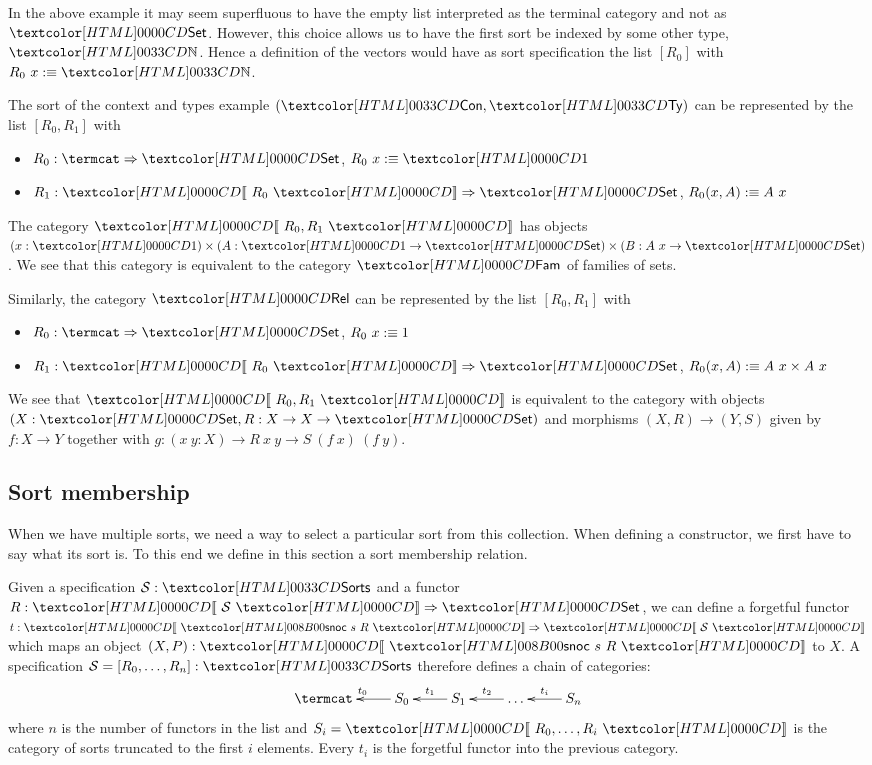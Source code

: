 In the above example it may seem superfluous to have the empty list
interpreted as the terminal category and not as $\Set$. However, this
choice allows us to have the first sort be indexed by some other type,
\eg $\natty$. Hence a definition of the vectors would have as sort
specification the list $[R_0]$ with $R_0\ x \ddefeq \natty$.

\begin{example}
  The sort of the context and types example $(\ttconty, \tttyty)$ can be
  represented by the list $[R_0, R_1]$ with
  \begin{itemize}
  \item $R_0 : \Func{\termcat}{\Set}$, $R_0\ x \ddefeq \unitty$
  \item $R_1 : \Func{\SortCat{R_0}}{\Set}$, $R_0 (x, A) :\equiv A\ x$
  \end{itemize}
  The category $\SortCat{R_0,R_1}$ has objects
  $(x : \unitty) \times (A : \unitty \to \Set) \times (B : A\ x \to
  \Set)$.
  We see that this category is equivalent to the category $\Fam$ of
  families of sets.
\end{example}

\begin{example}
  \label{rel-sorts}
  Similarly, the category $\Rel$ can be represented by the list
  $[R_0, R_1]$ with
  \begin{itemize}
  \item $R_0 : \Func{\termcat}{\Set}$, $R_0\ x :\equiv 1$
  \item $R_1 : \Func{\SortCat{R_0}}{\Set}$, $R_0 (x, A) :\equiv A\ x \times A\ x$
  \end{itemize}
  We see that $\SortCat{R_0,R_1}$ is equivalent to the category with
  objects $(X : \Set, R : X \to X \to \Set)$ and morphisms
  $(X,R) \to (Y,S)$ given by $f : X \to Y$ together with
  $g : (x\ y: X) \to R\ x\ y \to S\ (f\ x)\ (f\ y)$.
\end{example}

\subsection{Sort membership}

When we have multiple sorts, we need a way to select a particular sort
from this collection. When defining a constructor, we first have to
say what its sort is. To this end we define in this section a sort
membership relation.

Given a specification $\Ss : \sortsty$ and a functor
$R : \Func{\SortCat{\Ss}}{\Set}$, we can define a forgetful functor
$t : \Func{\SortCat{\sortssnoc\ s\ R}}{\SortCat{\Ss}}$ which maps an object
$(X , P) : \SortCat{\sortssnoc\ s\ R}$ to $X$. A specification
$\Ss = [R_0, \ldots, R_n] : \sortsty$ therefore defines a chain of
categories:
$$
\xymatrix{
\termcat &S_0 \ar[l]_{t_0} &S_1 \ar[l]_{t_1} &\hdots \ar[l]_{t_2} &S_n \ar[l]_{t_i}
}
$$
where $n$ is the number of functors in the list and
$S_i = \SortCat{R_0, \ldots, R_i}$ is the category of sorts truncated
to the first $i$ elements. Every $t_i$ is the forgetful functor into
the previous category.

